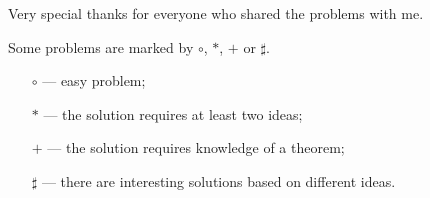 \documentclass[twoside]{book}
\begin{document}
Very special thanks for everyone who shared the problems with me.

\vfill

Some problems are marked by $\circ$, $*$, $+$ or $\sharp$.
\begin{itemize}
\item[$\circ$] --- easy problem;%
\item[$*$] --- the solution requires at least two ideas;%
\item[$+$] --- the solution requires knowledge of a theorem;%
\item[$\sharp$] --- there are interesting solutions based on different ideas.%
\end{itemize}













\backmatter
%
\newpage
{}
{\small

}
\sloppy
\printbibliography[heading=bibintoc]
\fussy
\end{document}
